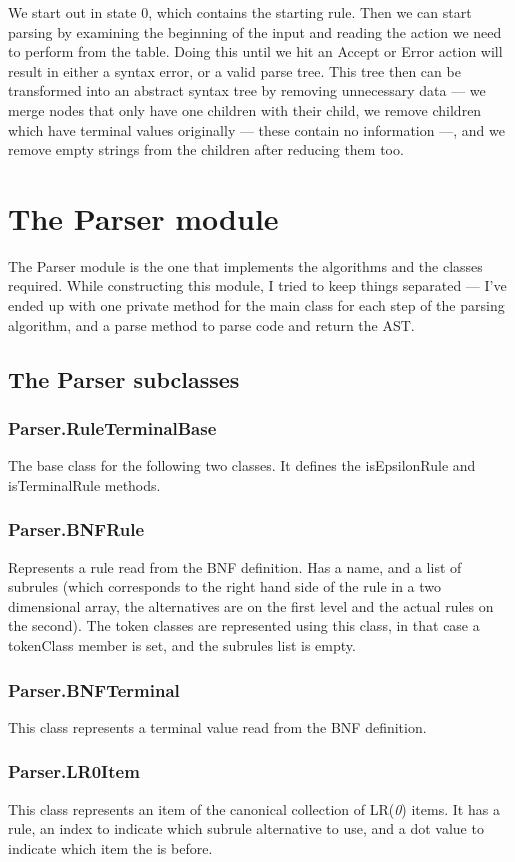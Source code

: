 We start out in state 0, which contains the starting rule. Then we can start parsing by examining the beginning of the input and reading the action we need to perform from the table. Doing this until we hit an Accept or Error action will result in either a syntax error, or a valid parse tree. This tree then can be transformed into an abstract syntax tree by removing unnecessary data --- we merge nodes that only have one children with their child, we remove children which have terminal values originally --- these contain no information ---, and we remove empty strings from the children after reducing them too.
\section{The Parser module}
The Parser module is the one that implements the algorithms and the classes required. While constructing this module, I tried to keep things separated --- I've ended up with one private method for the main class for each step of the parsing algorithm, and a parse method to parse code and return the AST.
\subsection{The Parser subclasses}
\subsubsection{Parser.RuleTerminalBase}
The base class for the following two classes. It defines the isEpsilonRule and isTerminalRule methods.
\subsubsection{Parser.BNFRule}
Represents a rule read from the BNF definition. Has a name, and a list of subrules (which corresponds to the right hand side of the rule in a two dimensional array, the alternatives are on the first level and the actual rules on the second). The token classes are represented using this class, in that case a tokenClass member is set, and the subrules list is empty.
\subsubsection{Parser.BNFTerminal}
This class represents a terminal value read from the BNF definition.
\subsubsection{Parser.LR0Item}
This class represents an item of the canonical collection of LR(\textit{0}) items. It has a rule, an index to indicate which subrule alternative to use, and a dot value to indicate which item the \textbullet is before.
